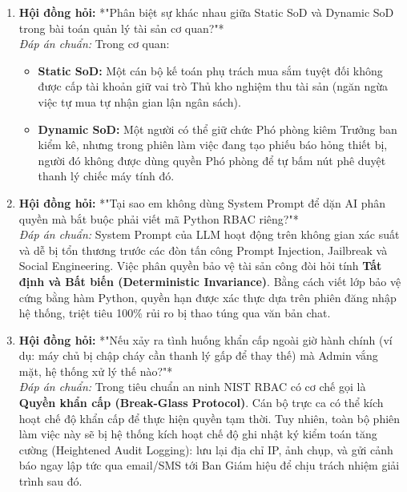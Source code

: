 \documentclass[11pt,a4paper]{article}
\begin{document}
\begin{deepdivebox}
\begin{enumerate}[leftmargin=1.5em]
    \item \textbf{Hội đồng hỏi:} *"Phân biệt sự khác nhau giữa Static SoD và Dynamic SoD trong bài toán quản lý tài sản cơ quan?"*\\
    \textit{Đáp án chuẩn:} Trong cơ quan:
    \begin{itemize}
        \item \textbf{Static SoD:} Một cán bộ kế toán phụ trách mua sắm tuyệt đối không được cấp tài khoản giữ vai trò Thủ kho nghiệm thu tài sản (ngăn ngừa việc tự mua tự nhận gian lận ngân sách).
        \item \textbf{Dynamic SoD:} Một người có thể giữ chức Phó phòng kiêm Trưởng ban kiểm kê, nhưng trong phiên làm việc đang tạo phiếu báo hỏng thiết bị, người đó không được dùng quyền Phó phòng để tự bấm nút phê duyệt thanh lý chiếc máy tính đó.
    \end{itemize}
    
    \item \textbf{Hội đồng hỏi:} *"Tại sao em không dùng System Prompt để dặn AI phân quyền mà bắt buộc phải viết mã Python RBAC riêng?"*\\
    \textit{Đáp án chuẩn:} System Prompt của LLM hoạt động trên không gian xác suất và dễ bị tổn thương trước các đòn tấn công Prompt Injection, Jailbreak và Social Engineering. Việc phân quyền bảo vệ tài sản công đòi hỏi tính \textbf{Tất định và Bất biến (Deterministic Invariance)}. Bằng cách viết lớp bảo vệ cứng bằng hàm Python, quyền hạn được xác thực dựa trên phiên đăng nhập hệ thống, triệt tiêu 100\% rủi ro bị thao túng qua văn bản chat.

    \item \textbf{Hội đồng hỏi:} *"Nếu xảy ra tình huống khẩn cấp ngoài giờ hành chính (ví dụ: máy chủ bị chập cháy cần thanh lý gấp để thay thế) mà Admin vắng mặt, hệ thống xử lý thế nào?"*\\
    \textit{Đáp án chuẩn:} Trong tiêu chuẩn an ninh NIST RBAC có cơ chế gọi là \textbf{Quyền khẩn cấp (Break-Glass Protocol)}. Cán bộ trực ca có thể kích hoạt chế độ khẩn cấp để thực hiện quyền tạm thời. Tuy nhiên, toàn bộ phiên làm việc này sẽ bị hệ thống kích hoạt chế độ ghi nhật ký kiểm toán tăng cường (Heightened Audit Logging): lưu lại địa chỉ IP, ảnh chụp, và gửi cảnh báo ngay lập tức qua email/SMS tới Ban Giám hiệu để chịu trách nhiệm giải trình sau đó.
\end{enumerate}
\end{deepdivebox}
\end{document}
